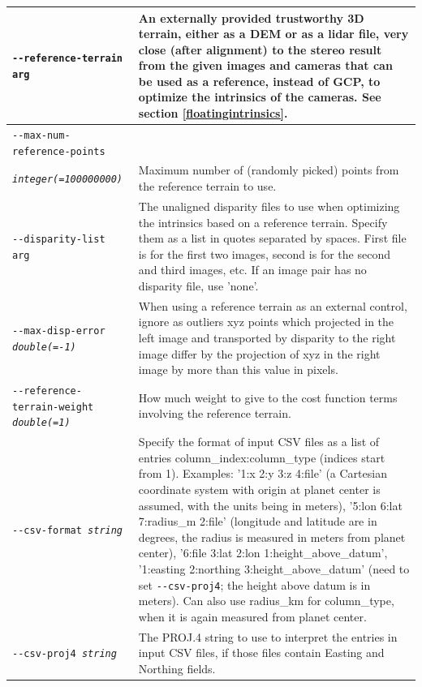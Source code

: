 \begin{longtable}{|p{8cm}|p{9cm}|}
\texttt{-\/-reference-terrain arg} & An externally provided trustworthy 3D terrain, either as a DEM or as a lidar file, very close (after alignment) to the stereo result from the given images and cameras that can be used as a reference, instead of GCP, to optimize the intrinsics of the cameras. See section \ref{floatingintrinsics}. \\ \hline

\texttt{-\/-max-num-reference-points} \\
\texttt{\textit{integer(=100000000)}}   & Maximum number of (randomly picked) points from the reference terrain to use.\\ \hline

\texttt{-\/-disparity-list arg} & The unaligned disparity files to use when optimizing the intrinsics based on a reference terrain. Specify them as a list in quotes separated by spaces. First file is for the first two images, second is for the second and third images, etc. If an image pair has no disparity file, use 'none'. \\ \hline

\texttt{-\/-max-disp-error \textit{double(=-1)}} & When using a reference terrain as an external control, ignore as outliers xyz points which projected in the left image and transported by disparity to the right image differ by the projection of xyz in the right image by more than this value in pixels.\\ \hline

\texttt{-\/-reference-terrain-weight \textit{double(=1)}} & How much weight to give to the cost function terms involving the reference terrain. \\ \hline

\texttt{-\/-csv-format \textit{string}} & Specify the format of input
CSV files as a list of entries column\_index:column\_type (indices start
from 1). Examples: '1:x 2:y 3:z 4:file' (a Cartesian coordinate system with
origin at planet center is assumed, with the units being in meters),
'5:lon 6:lat 7:radius\_m 2:file' (longitude and latitude are in degrees, the
radius is measured in meters from planet center), '6:file 3:lat 2:lon
1:height\_above\_datum', '1:easting 2:northing 3:height\_above\_datum'
(need to set \texttt{-\/-csv-proj4}; the height above datum is in
meters). Can also use radius\_km for column\_type, when it is again
measured from planet center.\\ \hline

\texttt{-\/-csv-proj4 \textit{string}} & The PROJ.4 string to use to
interpret the entries in input CSV files, if those files contain Easting
and Northing fields. \\ \hline


\end{longtable}
